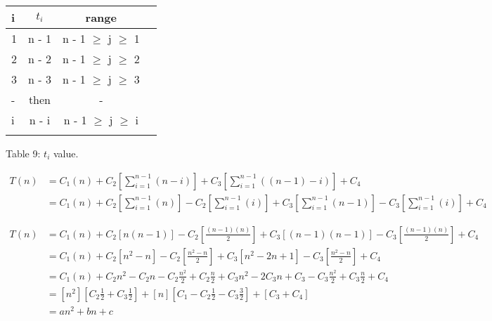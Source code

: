 \documentclass[10pt,a4paper]{article}
\begin{document}
\begin{center}
\begin{tabular}[.5cm]{l c c c }
\toprule
i & $t_{i}$ & range \\
\midrule
1 & n - 1 & n - 1 $\geq$ j $\geq$ 1 \\
\cmidrule{1-3}
2 & n - 2 & n - 1 $\geq$ j $\geq$ 2 \\
\cmidrule{1-3}
3 & n - 3 & n - 1 $\geq$ j $\geq$ 3 \\
\cmidrule{1-3}
- & then & - \\
\cmidrule{1-3}
i & n - i & n - 1 $\geq$ j $\geq$ i\\
\bottomrule
\linebreak
\end{tabular}
\linebreak Table 9: $t_{i}$ value.
\end{center}

{\bfseries\itshape{}} \hfill \break

\begin{ceqn}
\begin{align}
T ( n ) &= C_{1}( n ) + C_{2}[ \sum_{i = 1}^{n - 1} ( n - i ) ] + C_{3}[ \sum_{i = 1}^{n - 1} ( ( n - 1 ) - i ) ] + C_{4} \\
&= C_{1}( n ) + C_{2}[ \sum_{i = 1}^{n - 1} ( n ) ] - C_{2}[ \sum_{i = 1}^{n - 1} ( i ) ] + C_{3}[ \sum_{i = 1}^{n - 1} ( n - 1 ) ] - C_{3}[ \sum_{i = 1}^{n - 1} ( i ) ] + C_{4}
\end{align}
\end{ceqn}

{\bfseries\itshape\color{CadetBlue}{Using:}} \hfill \break
{} \hfill

{\bfseries\itshape\color{CadetBlue}{Then:}} \hfill 

\begin{ceqn}
\begin{align}
T( n ) &= C_{1}( n ) + C_{2}[ n ( n - 1 ) ] - C_{2}[ \frac{( n - 1 )( n )}{2} ] + C_{3}[ ( n - 1 )( n - 1 ) ] - C_{3}[ \frac{( n - 1 )( n )}{2} ] + C_{4} \\
&= C_{1}( n ) + C_{2}[ n^{2} - n ] - C_{2}[ \frac{n^{2} - n}{2} ] + C_{3}[ n^{2} - 2n + 1 ] - C_{3}[ \frac{n^{2} - n}{2} ] + C_{4} \\
&= C_{1}( n ) + C_{2}n^{2} - C_{2}n - C_{2}\frac{n^{2}}{2} + C_{2}\frac{n}{2} + C_{3}n^{2} - 2C_{3}n + C_{3} - C_{3}\frac{n^{2}}{2} + C_{3}\frac{n}{2} + C_{4} \\
&= [ n^{2} ][ C_{2}\frac{1}{2} + C_{3}\frac{1}{2} ] + [ n ][ C_{1} - C_{2}\frac{1}{2} - C_{3}\frac{3}{2}] + [C_{3} + C_{4}] \\
&= an^{2} + bn + c
\end{align}
\end{ceqn}
\end{document}
